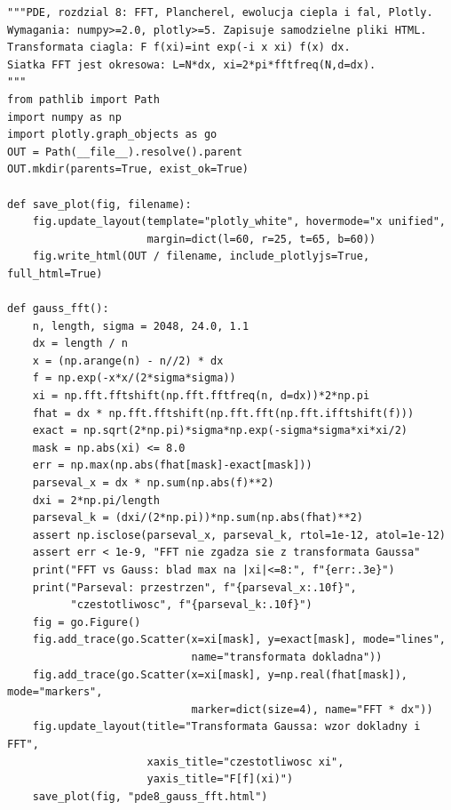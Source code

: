 \begin{lstlisting}[style=pythonpde,
caption={Transformata Gaussa, dyskretna tożsamość Parsevala, ewolucje spektralne oraz normy $H^s$ (Plotly)},
label={code:pde8-plotly}]
"""PDE, rozdzial 8: FFT, Plancherel, ewolucja ciepla i fal, Plotly.
Wymagania: numpy>=2.0, plotly>=5. Zapisuje samodzielne pliki HTML.
Transformata ciagla: F f(xi)=int exp(-i x xi) f(x) dx.
Siatka FFT jest okresowa: L=N*dx, xi=2*pi*fftfreq(N,d=dx).
"""
from pathlib import Path
import numpy as np
import plotly.graph_objects as go
OUT = Path(__file__).resolve().parent
OUT.mkdir(parents=True, exist_ok=True)

def save_plot(fig, filename):
    fig.update_layout(template="plotly_white", hovermode="x unified",
                      margin=dict(l=60, r=25, t=65, b=60))
    fig.write_html(OUT / filename, include_plotlyjs=True, full_html=True)

def gauss_fft():
    n, length, sigma = 2048, 24.0, 1.1
    dx = length / n
    x = (np.arange(n) - n//2) * dx
    f = np.exp(-x*x/(2*sigma*sigma))
    xi = np.fft.fftshift(np.fft.fftfreq(n, d=dx))*2*np.pi
    fhat = dx * np.fft.fftshift(np.fft.fft(np.fft.ifftshift(f)))
    exact = np.sqrt(2*np.pi)*sigma*np.exp(-sigma*sigma*xi*xi/2)
    mask = np.abs(xi) <= 8.0
    err = np.max(np.abs(fhat[mask]-exact[mask]))
    parseval_x = dx * np.sum(np.abs(f)**2)
    dxi = 2*np.pi/length
    parseval_k = (dxi/(2*np.pi))*np.sum(np.abs(fhat)**2)
    assert np.isclose(parseval_x, parseval_k, rtol=1e-12, atol=1e-12)
    assert err < 1e-9, "FFT nie zgadza sie z transformata Gaussa"
    print("FFT vs Gauss: blad max na |xi|<=8:", f"{err:.3e}")
    print("Parseval: przestrzen", f"{parseval_x:.10f}",
          "czestotliwosc", f"{parseval_k:.10f}")
    fig = go.Figure()
    fig.add_trace(go.Scatter(x=xi[mask], y=exact[mask], mode="lines",
                             name="transformata dokladna"))
    fig.add_trace(go.Scatter(x=xi[mask], y=np.real(fhat[mask]), mode="markers",
                             marker=dict(size=4), name="FFT * dx"))
    fig.update_layout(title="Transformata Gaussa: wzor dokladny i FFT",
                      xaxis_title="czestotliwosc xi",
                      yaxis_title="F[f](xi)")
    save_plot(fig, "pde8_gauss_fft.html")


\end{lstlisting}
